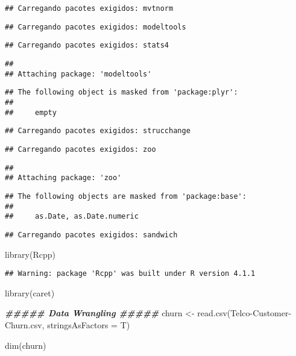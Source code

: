 \documentclass[
]{article}
\newenvironment{Shaded}{\begin{snugshade}}{\end{snugshade}}
\newcommand{\AttributeTok}[1]{\textcolor[rgb]{0.77,0.63,0.00}{#1}}
\newcommand{\DocumentationTok}[1]{\textcolor[rgb]{0.56,0.35,0.01}{\textbf{\textit{#1}}}}
\newcommand{\FunctionTok}[1]{\textcolor[rgb]{0.00,0.00,0.00}{#1}}
\newcommand{\NormalTok}[1]{#1}
\newcommand{\OtherTok}[1]{\textcolor[rgb]{0.56,0.35,0.01}{#1}}
\newcommand{\StringTok}[1]{\textcolor[rgb]{0.31,0.60,0.02}{#1}}
\begin{document}
\begin{verbatim}
## Carregando pacotes exigidos: mvtnorm
\end{verbatim}

\begin{verbatim}
## Carregando pacotes exigidos: modeltools
\end{verbatim}

\begin{verbatim}
## Carregando pacotes exigidos: stats4
\end{verbatim}

\begin{verbatim}
## 
## Attaching package: 'modeltools'
\end{verbatim}

\begin{verbatim}
## The following object is masked from 'package:plyr':
## 
##     empty
\end{verbatim}

\begin{verbatim}
## Carregando pacotes exigidos: strucchange
\end{verbatim}

\begin{verbatim}
## Carregando pacotes exigidos: zoo
\end{verbatim}

\begin{verbatim}
## 
## Attaching package: 'zoo'
\end{verbatim}

\begin{verbatim}
## The following objects are masked from 'package:base':
## 
##     as.Date, as.Date.numeric
\end{verbatim}

\begin{verbatim}
## Carregando pacotes exigidos: sandwich
\end{verbatim}

\begin{Shaded}
\begin{Highlighting}[]
\FunctionTok{library}\NormalTok{(Rcpp)}
\end{Highlighting}
\end{Shaded}

\begin{verbatim}
## Warning: package 'Rcpp' was built under R version 4.1.1
\end{verbatim}

\begin{Shaded}
\begin{Highlighting}[]
\FunctionTok{library}\NormalTok{(caret)}

\DocumentationTok{\#\#\#\#\# Data Wrangling \#\#\#\#\#}
\NormalTok{churn }\OtherTok{\textless{}{-}} \FunctionTok{read.csv}\NormalTok{(}\StringTok{\textquotesingle{}Telco{-}Customer{-}Churn.csv\textquotesingle{}}\NormalTok{, }\AttributeTok{stringsAsFactors =}\NormalTok{ T)}

\FunctionTok{dim}\NormalTok{(churn)}
\end{Highlighting}
\end{Shaded}
\end{document}
